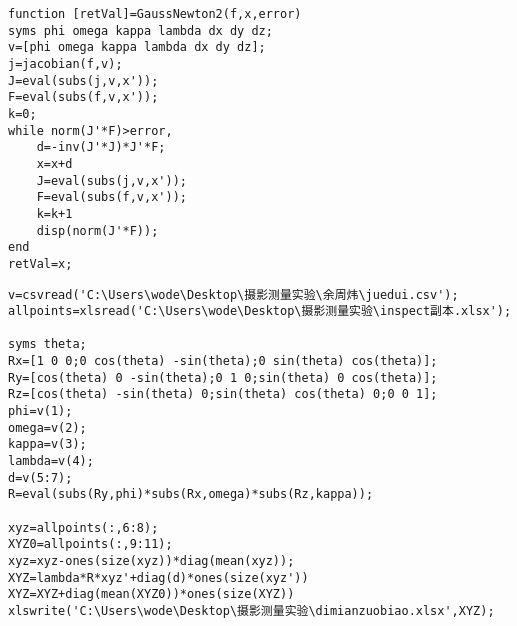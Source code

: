 \begin{lstlisting}[caption=GaussNewton2.m文件]
function [retVal]=GaussNewton2(f,x,error)
syms phi omega kappa lambda dx dy dz;
v=[phi omega kappa lambda dx dy dz];
j=jacobian(f,v);
J=eval(subs(j,v,x'));
F=eval(subs(f,v,x'));
k=0;
while norm(J'*F)>error,
    d=-inv(J'*J)*J'*F;
    x=x+d
    J=eval(subs(j,v,x'));
    F=eval(subs(f,v,x'));
    k=k+1
    disp(norm(J'*F));
end
retVal=x;
\end{lstlisting}

\begin{lstlisting}[caption=jueduitransform.m]
v=csvread('C:\Users\wode\Desktop\摄影测量实验\余周炜\juedui.csv');
allpoints=xlsread('C:\Users\wode\Desktop\摄影测量实验\inspect副本.xlsx');

syms theta;
Rx=[1 0 0;0 cos(theta) -sin(theta);0 sin(theta) cos(theta)];
Ry=[cos(theta) 0 -sin(theta);0 1 0;sin(theta) 0 cos(theta)];
Rz=[cos(theta) -sin(theta) 0;sin(theta) cos(theta) 0;0 0 1];
phi=v(1);
omega=v(2);
kappa=v(3);
lambda=v(4);
d=v(5:7);
R=eval(subs(Ry,phi)*subs(Rx,omega)*subs(Rz,kappa));

xyz=allpoints(:,6:8);
XYZ0=allpoints(:,9:11);
xyz=xyz-ones(size(xyz))*diag(mean(xyz));
XYZ=lambda*R*xyz'+diag(d)*ones(size(xyz'))
XYZ=XYZ+diag(mean(XYZ0))*ones(size(XYZ))
xlswrite('C:\Users\wode\Desktop\摄影测量实验\dimianzuobiao.xlsx',XYZ);
\end{lstlisting}

